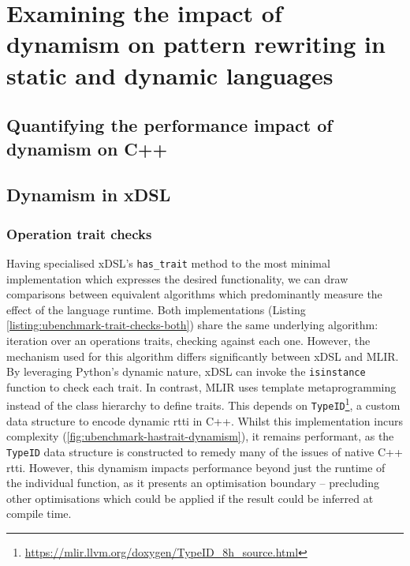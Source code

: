 

\chapter{Examining the impact of dynamism on pattern rewriting in static and dynamic languages}
\label{chap:dynamism-pattern-rewriting}

\section{Quantifying the performance impact of dynamism on C++}

\section{Dynamism in xDSL}

\subsection{Operation trait checks}

Having specialised xDSL's \texttt{has_trait} method to the most minimal implementation which expresses the desired functionality, we can draw comparisons between equivalent algorithms which predominantly measure the effect of the language runtime.
Both implementations (Listing \ref{listing:ubenchmark-trait-checks-both}) share the same underlying algorithm: iteration over an operations traits, checking against each one. However, the mechanism used for this algorithm differs significantly between xDSL and MLIR.
By leveraging Python's dynamic nature, xDSL can invoke the \texttt{isinstance} function to check each trait. In contrast, MLIR uses template metaprogramming instead of the class hierarchy to define traits. This depends on \texttt{TypeID}\footnote{\url{https://mlir.llvm.org/doxygen/TypeID_8h_source.html}}, a custom data structure to encode dynamic \ac{rtti} in C++.
Whilst this implementation incurs complexity (\autoref{fig:ubenchmark-hastrait-dynamism}), it remains performant, as the \texttt{TypeID} data structure is constructed to remedy many of the issues of native C++ \ac{rtti}.
However, this dynamism impacts performance beyond just the runtime of the individual function, as it presents an optimisation boundary -- precluding other optimisations which could be applied if the result could be inferred at compile time. %

